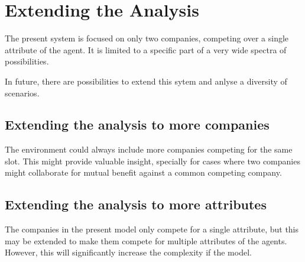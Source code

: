 
\chapter{Extending the Analysis} %

\label{Chapter6} %


The present system is focused on only two companies, competing over a single attribute of the agent. It is limited to a specific  part of a very wide spectra of possibilities.

In future, there are possibilities to extend this sytem and anlyse a diversity of scenarios.


\section{Extending the analysis to more companies}

The environment could always include more companies competing for the same slot. This might provide valuable insight, specially for cases where two companies might collaborate for mutual benefit against a common competing company.


\section{Extending the analysis to more attributes}

The companies in the present model only compete for a single attribute, but this may be extended to make them compete for multiple attributes of the  agents. However, this will significantly increase the complexity if the model.


